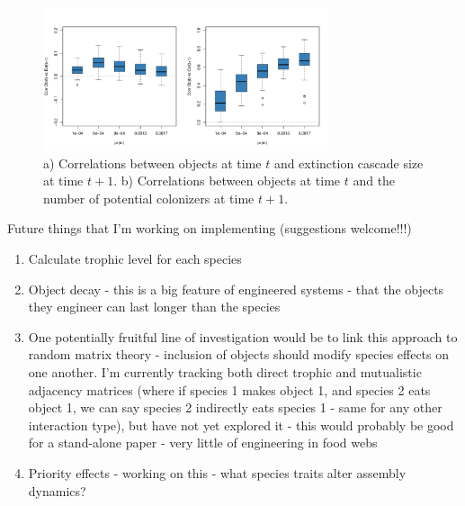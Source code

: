 \documentclass[twocolumn,preprintnumbers,amsmath,amssymb,superscriptaddress]{revtex4-1}
\begin{document}
\begin{figure}[ht]
\centering
\includegraphics[width=0.75\textwidth]{fig_corrobext_tl2S.pdf}
\caption{
a) Correlations between objects at time $t$ and extinction cascade size at time $t+1$. b) Correlations between objects at time $t$ and the number of potential colonizers at time $t+1$.
}
\label{fig_corrobext}
\end{figure} 


Future things that I'm working on implementing (suggestions welcome!!!)
\begin{enumerate}
\item Calculate trophic level for each species
\item Object decay - this is a big feature of engineered systems - that the objects they engineer can last longer than the species
\item One potentially fruitful line of investigation would be to link this approach to random matrix theory - inclusion of objects should modify species effects on one another. I'm currently tracking both direct trophic and mutualistic adjacency matrices (where if species 1 makes object 1, and species 2 eats object 1, we can say species 2 indirectly eats species 1 - same for any other interaction type), but have not yet explored it - this would probably be good for a stand-alone paper - very little of engineering in food webs
\item Priority effects - working on this - what species traits alter assembly dynamics?
\end{enumerate}
\end{document}
